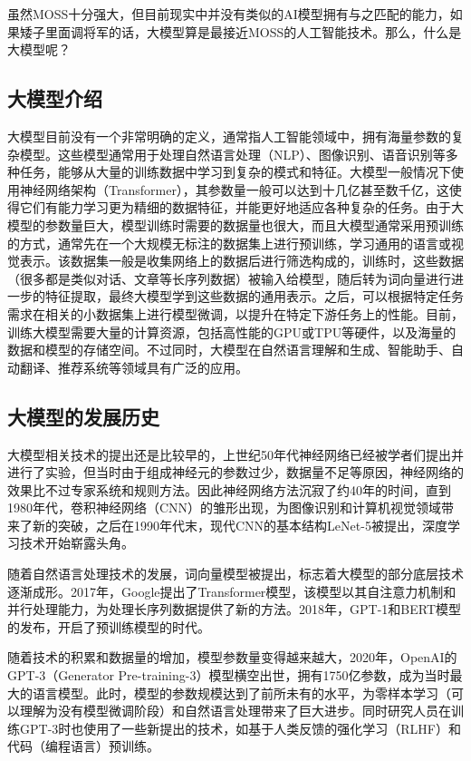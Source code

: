 虽然MOSS十分强大，但目前现实中并没有类似的AI模型拥有与之匹配的能力，如果矮子里面调将军的话，大模型算是最接近MOSS的人工智能技术。那么，什么是大模型呢？

\subsection{大模型介绍}

大模型目前没有一个非常明确的定义，通常指人工智能领域中，拥有海量参数的复杂模型。这些模型通常用于处理自然语言处理（NLP）、图像识别、语音识别等多种任务，能够从大量的训练数据中学习到复杂的模式和特征。大模型一般情况下使用神经网络架构（Transformer），其参数量一般可以达到十几亿甚至数千亿，这使得它们有能力学习更为精细的数据特征，并能更好地适应各种复杂的任务。由于大模型的参数量巨大，模型训练时需要的数据量也很大，而且大模型通常采用预训练的方式，通常先在一个大规模无标注的数据集上进行预训练，学习通用的语言或视觉表示。该数据集一般是收集网络上的数据后进行筛选构成的，训练时，这些数据（很多都是类似对话、文章等长序列数据）被输入给模型，随后转为词向量进行进一步的特征提取，最终大模型学到这些数据的通用表示。之后，可以根据特定任务需求在相关的小数据集上进行模型微调，以提升在特定下游任务上的性能。目前，训练大模型需要大量的计算资源，包括高性能的GPU或TPU等硬件，以及海量的数据和模型的存储空间。不过同时，大模型在自然语言理解和生成、智能助手、自动翻译、推荐系统等领域具有广泛的应用。

\subsection{大模型的发展历史}
大模型相关技术的提出还是比较早的，上世纪50年代神经网络已经被学者们提出并进行了实验，但当时由于组成神经元的参数过少，数据量不足等原因，神经网络的效果比不过专家系统和规则方法。因此神经网络方法沉寂了约40年的时间，直到1980年代，卷积神经网络（CNN）的雏形出现，为图像识别和计算机视觉领域带来了新的突破，之后在1990年代末，现代CNN的基本结构LeNet-5被提出，深度学习技术开始崭露头角。

随着自然语言处理技术的发展，词向量模型被提出，标志着大模型的部分底层技术逐渐成形。2017年，Google提出了Transformer模型，该模型以其自注意力机制和并行处理能力，为处理长序列数据提供了新的方法。2018年，GPT-1和BERT模型的发布，开启了预训练模型的时代。

随着技术的积累和数据量的增加，模型参数量变得越来越大，2020年，OpenAI的GPT-3（Generator Pre-training-3）模型横空出世，拥有1750亿参数，成为当时最大的语言模型。此时，模型的参数规模达到了前所未有的水平，为零样本学习（可以理解为没有模型微调阶段）和自然语言处理带来了巨大进步。同时研究人员在训练GPT-3时也使用了一些新提出的技术，如基于人类反馈的强化学习（RLHF）和代码（编程语言）预训练。

